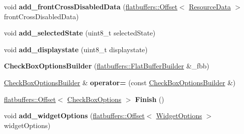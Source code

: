 \begin{DoxyCompactItemize}
void {\bfseries add\+\_\+front\+Cross\+Disabled\+Data} (\hyperlink{structflatbuffers_1_1Offset}{flatbuffers\+::\+Offset}$<$ \hyperlink{structflatbuffers_1_1ResourceData}{Resource\+Data} $>$ front\+Cross\+Disabled\+Data)
\item 
\mbox{\label{structflatbuffers_1_1CheckBoxOptionsBuilder_a4b38f22c1f03918e933f08016a587800}} 
void {\bfseries add\+\_\+selected\+State} (uint8\+\_\+t selected\+State)
\item 
\mbox{\label{structflatbuffers_1_1CheckBoxOptionsBuilder_a123b4cc1d2b211073e74f40dd44dab69}} 
void {\bfseries add\+\_\+displaystate} (uint8\+\_\+t displaystate)
\item 
\mbox{\label{structflatbuffers_1_1CheckBoxOptionsBuilder_a0ce799c2555ef76176856fda11fa1b3c}} 
{\bfseries Check\+Box\+Options\+Builder} (\hyperlink{classflatbuffers_1_1FlatBufferBuilder}{flatbuffers\+::\+Flat\+Buffer\+Builder} \&\+\_\+fbb)
\item 
\mbox{\label{structflatbuffers_1_1CheckBoxOptionsBuilder_a67f0df2f177eb217634224bfeb23561f}} 
\hyperlink{structflatbuffers_1_1CheckBoxOptionsBuilder}{Check\+Box\+Options\+Builder} \& {\bfseries operator=} (const \hyperlink{structflatbuffers_1_1CheckBoxOptionsBuilder}{Check\+Box\+Options\+Builder} \&)
\item 
\mbox{\label{structflatbuffers_1_1CheckBoxOptionsBuilder_adda35f88b6af82fac582eda1e653b5cf}} 
\hyperlink{structflatbuffers_1_1Offset}{flatbuffers\+::\+Offset}$<$ \hyperlink{structflatbuffers_1_1CheckBoxOptions}{Check\+Box\+Options} $>$ {\bfseries Finish} ()
\item 
\mbox{\label{structflatbuffers_1_1CheckBoxOptionsBuilder_a0c78a11ee430ab944c86057dc253528a}} 
void {\bfseries add\+\_\+widget\+Options} (\hyperlink{structflatbuffers_1_1Offset}{flatbuffers\+::\+Offset}$<$ \hyperlink{structflatbuffers_1_1WidgetOptions}{Widget\+Options} $>$ widget\+Options)
\item 
\mbox{\label{structflatbuffers_1_1CheckBoxOptionsBuilder_ade8e6888ee271128712d259baf14e89f}} 

\end{DoxyCompactItemize}
